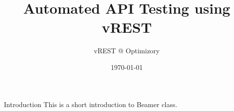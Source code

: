 \documentclass{beamer}
\title[Automated API Testing using vREST]{Automated API Testing using vREST}
\author{vREST @ Optimizory}
\date{\today}
\begin{document}
\begin{frame}
\titlepage
\end{frame}


\begin{frame}{Introduction}
This is a short introduction to Beamer class.
\end{frame}
\end{document}
